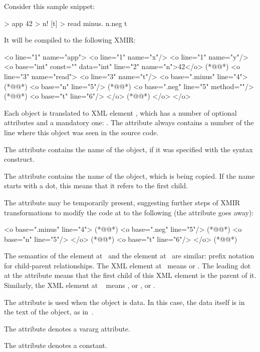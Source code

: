 Consider this sample \eolang{} snippet:

\begin{ffcode}
[x y] > app
  42 > n!
  [t] > read
    minus.
      n.neg
      t
\end{ffcode}

It will be compiled to the following XMIR:

\begin{ffcode}
<o line="1" name="app">
  <o line="1" name="x"/>
  <o line="1" name="y"/>
  <o base="int" const="" data="int"
    line="2" name="n">42</o>   (*@\label{ln:xml-data}@*)
  <o line="3" name="read">
    <o line="3" name="t"/>
    <o base=".minus" line="4"> (*@\label{ln:xml-minus}@*)
      <o base="n" line="5"/> (*@\label{ln:method-start}@*)
      <o base=".neg" line="5" method=""/>  (*@\label{ln:method-end}@*)
      <o base="t" line="6"/>
    </o> (*@\label{ln:xml-minus-end}@*)
  </o>
</o>
\end{ffcode}

Each object is translated to XML element , which has
a number of optional attributes and a mandatory one: .
The attribute  always contains a number of the
line where this object was seen in the source code.

The attribute  contains the name of the object, if
it was specified with the \ff{>} syntax construct.

The attribute  contains the name of the object, which
is being copied. If the name starts with a dot, this means
that it refers to the first  child.

The attribute  may be temporarily present, suggesting
further steps of XMIR transformations to modify the code
at  to the following (the attribute 
goes away):

\begin{ffcode}
<o base=".minus" line="4"> (*@\label{ln:new-minus}@*)
  <o base=".neg" line="5"/> (*@\label{ln:xml-neg}@*)
    <o base="n" line="5"/>
  </o> (*@\label{ln:xml-neg-end}@*)
  <o base="t" line="6"/>
</o> (*@\label{ln:new-minus-end}@*)
\end{ffcode}

The semantics of the element  at~
and the element  at~ are similar: prefix
notation for child-parent relationships. The XML element at~
means  or . The
leading dot at the attribute  means that the first
child of this XML element is the \eolang{} parent of it.
Similarly, the XML element at ~
means , or , or .

The attribute  is used when the object is data. In this
case, the data itself is in the text of the object, as in~.

The attribute  denotes a vararg attribute.

The attribute  denotes a constant.
